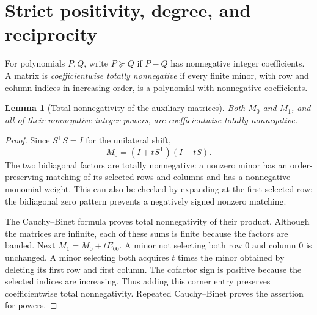 \documentclass[11pt]{article}
\newtheorem{lemma}[theorem]{Lemma}
\theoremstyle{definition}
\theoremstyle{remark}
\newcommand{\coeffge}{\succeq}
\theoremstyle{definition}
\theoremstyle{plain}
\numberwithin{equation}{section}
\begin{document}
\section{Strict positivity, degree, and reciprocity}
\label{sec:positive}

For polynomials $P,Q$, write $P\coeffge Q$ if $P-Q$ has nonnegative
integer coefficients. A matrix is \emph{coefficientwise totally nonnegative}
if every finite minor, with row and column indices in increasing order,
is a polynomial with nonnegative coefficients.

\begin{lemma}[Total nonnegativity of the auxiliary matrices]
\label{lem:TP}
Both $M_0$ and $M_1$, and all of their nonnegative integer powers, are
coefficientwise totally nonnegative.
\end{lemma}
\begin{proof}
Since $S^{\mathsf T}S=I$ for the unilateral shift,
\begin{equation}
 M_0=(I+tS^{\mathsf T})(I+tS).
 \label{eq:bidiagonal}
\end{equation}
The two bidiagonal factors are totally nonnegative: a nonzero minor has
an order-preserving matching of its selected rows and columns and has a
nonnegative monomial weight. This can also be checked by expanding at the
first selected row; the bidiagonal zero pattern prevents a negatively
signed nonzero matching.

The Cauchy--Binet formula proves total nonnegativity of their product.
Although the matrices are infinite, each of these sums is finite because
the factors are banded. Next $M_1=M_0+tE_{00}$. A minor not selecting both
row $0$ and column $0$ is unchanged. A minor selecting both acquires
$t$ times the minor obtained by deleting its first row and first column.
The cofactor sign is positive because the selected indices are increasing.
Thus adding this corner entry preserves coefficientwise total
nonnegativity. Repeated Cauchy--Binet proves the assertion for powers.
\end{proof}
\end{document}
